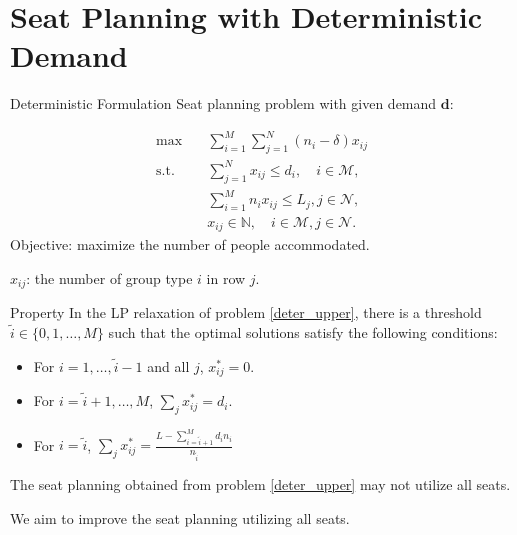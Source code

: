 
\section{Seat Planning with Deterministic Demand}
    \frame{\sectionpage}

  \begin{frame}{Deterministic Formulation}  %
    Seat planning problem with given demand $\bm{d}$:

    \begin{equation}\label{deter_upper}
      \begin{aligned}
      \max \quad & \sum_{i=1}^{M}  \sum_{j= 1}^{N} (n_i- \delta) x_{ij} \\
      \text {s.t.} \quad & \sum_{j= 1}^{N} x_{ij} \leq d_{i}, \quad i \in \mathcal{M}, \\
      & \sum_{i=1}^{M} n_{i} x_{ij} \leq L_j, j \in \mathcal{N}, \\
      & x_{ij} \in \mathbb{N}, \quad i \in \mathcal{M}, j \in \mathcal{N}.
      \end{aligned}
    \end{equation}
    Objective: maximize the number of people accommodated.

    $x_{ij}$: the number of group type $i$ in row $j$.
  \end{frame}

  \begin{frame}{Property}
    In the LP relaxation of problem \eqref{deter_upper}, there is a threshold $\tilde{i} \in\{0,1,\ldots, M\}$ such that the optimal solutions satisfy the following conditions:

    \begin{itemize}
      \item For $i = 1,\ldots, \tilde{i} -1$ and all $j$, $x_{ij}^{*} = 0$. 
      \item For $i = \tilde{i} +1,\ldots, M$, $\sum_{j} x_{ij}^{*} = d_{i}$. 

      \item For $i = \tilde{i}$, $\sum_{j} x_{ij}^{*} = \frac{L - \sum_{i = \tilde{i}+1}^{M} {d_i n_i}}{n_{\tilde{i}}}$ 
    \end{itemize}

    \vspace{0.5cm}
    The seat planning obtained from problem \eqref{deter_upper} may not utilize all seats.

    \vspace{0.5cm}
    
    We aim to improve the seat planning utilizing all seats.

  \end{frame}

